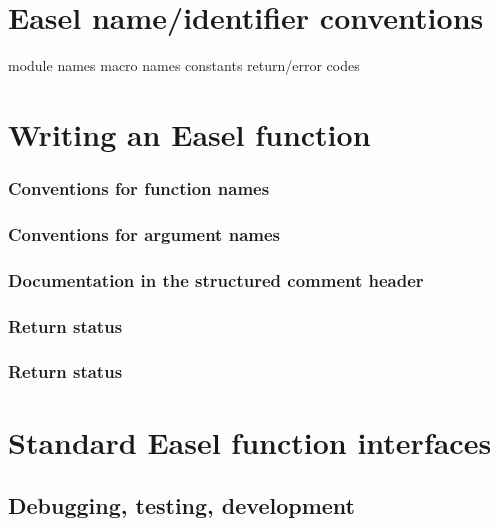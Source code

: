 
\section{Easel name/identifier conventions}

module names
macro names
constants
return/error codes


\section{Writing an Easel function}

\subsubsection{Conventions for function names}

\subsubsection{Conventions for argument names}

\subsubsection{Documentation in the structured comment header}

\subsubsection{Return status}

\subsubsection{Return status}

\section{Standard Easel function interfaces}

\subsection{Debugging, testing, development}

